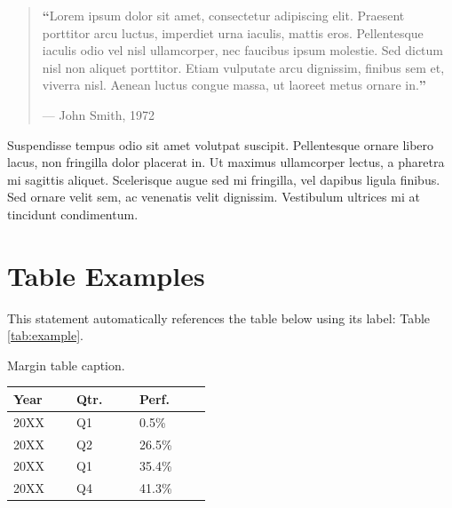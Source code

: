 \documentclass[
	a4paper, %
	12pt, %
]{include/CSSullivanBusinessReport}
\begin{document}
\begin{quote}
	\textbf{\LARGE ``}Lorem ipsum dolor sit amet, consectetur adipiscing elit. Praesent porttitor arcu luctus, imperdiet urna iaculis, mattis eros. Pellentesque iaculis odio vel nisl ullamcorper, nec faucibus ipsum molestie. Sed dictum nisl non aliquet porttitor. Etiam vulputate arcu dignissim, finibus sem et, viverra nisl. Aenean luctus congue massa, ut laoreet metus ornare in.\textbf{''}
	
	\hfill--- John Smith, 1972
\end{quote}

Suspendisse tempus odio sit amet volutpat suscipit. Pellentesque ornare libero lacus, non fringilla dolor placerat in. Ut maximus ullamcorper lectus, a pharetra mi sagittis aliquet. Scelerisque augue sed mi fringilla, vel dapibus ligula finibus. Sed ornare velit sem, ac venenatis velit dignissim. Vestibulum ultrices mi at tincidunt condimentum.


\section{Table Examples}

This statement automatically references the table below using its label: Table \ref{tab:example}.


\begin{margintable} %
	\footnotesize %
	\caption{Margin table caption.}
	\begin{tabular}{L{0.22\linewidth} C{0.22\linewidth} R{0.25\linewidth}}
		\toprule
		\textbf{Year} & \textbf{Qtr.} & \textbf{Perf.}\\
		\midrule
		20XX & Q1 & 0.5\%\\
		20XX & Q2 & 26.5\%\\
		20XX & Q1 & 35.4\%\\
		20XX & Q4 & 41.3\%\\
		\bottomrule
	\end{tabular}
\end{margintable}

\end{document}
